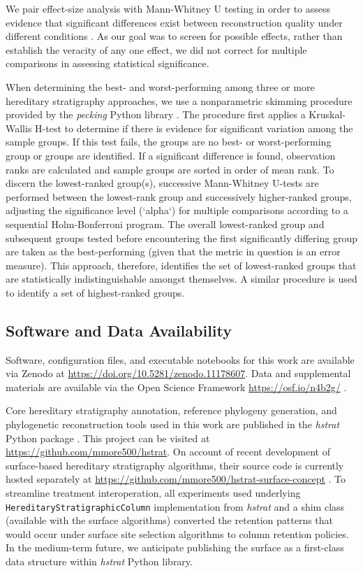 We pair effect-size analysis with Mann-Whitney U testing in order to assess evidence that significant differences exist between reconstruction quality under different conditions \citep{mann1947on}.
As our goal was to screen for possible effects, rather than establish the veracity of any one effect, we did not correct for multiple comparisons in assessing statistical significance.


When determining the best- and worst-performing among three or more hereditary stratigraphy approaches, we use a nonparametric skimming procedure provided by the \textit{pecking} Python library \citep{moreno2024pecking}.
The procedure first applies a Kruskal-Wallis H-test to determine if there is evidence for significant variation among the sample groups.
If this test fails, the groups are no best- or worst-performing group or groups are identified.
If a significant difference is found, observation ranks are calculated and sample groups are sorted in order of mean rank.
To discern the lowest-ranked group(s), successive Mann-Whitney U-tests are performed between the lowest-rank group and successively higher-ranked groups, adjusting the significance level (`alpha`) for multiple comparisons according to a sequential Holm-Bonferroni program.
The overall lowest-ranked group and subsequent groups tested before encountering the first significantly differing group are taken as the best-performing (given that the metric in question is an error measure).
This approach, therefore, identifies the set of lowest-ranked groups that are statistically indistinguishable amongst themselves.
A similar procedure is used to identify a set of highest-ranked groups.

\subsection{Software and Data Availability}

Software, configuration files, and executable notebooks for this work are available via Zenodo at \url{https://doi.org/10.5281/zenodo.11178607}.
Data and supplemental materials are available via the Open Science Framework \url{https://osf.io/n4b2g/} \citep{foster2017open}.

Core hereditary stratigraphy annotation, reference phylogeny generation, and phylogenetic reconstruction tools used in this work are published in the \textit{hstrat} Python package \citep{moreno2022hstrat}.
This project can be visited at \url{https://github.com/mmore500/hstrat}.
On account of recent development of surface-based hereditary stratigraphy algorithms, their source code is currently hosted separately at \url{https://github.com/mmore500/hstrat-surface-concept} \citep{moreno2024hsurf}.
To streamline treatment interoperation, all experiments used underlying \texttt{HereditaryStratigraphicColumn} implementation from \textit{hstrat} and a shim class (available with the surface algorithms) converted the retention patterns that would occur under surface site selection algorithms to column retention policies.
In the medium-term future, we anticipate publishing the surface as a first-class data structure within \textit{hstrat} Python library.

